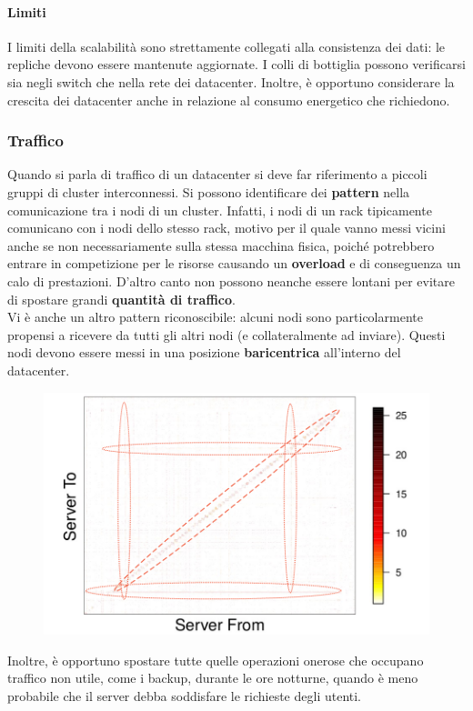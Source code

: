 \documentclass{article}
\begin{document}
		\hypertarget{limiti}{%
		\paragraph{Limiti}\label{limiti}}
		I limiti della scalabilità sono strettamente collegati alla
		consistenza dei dati: le repliche devono essere mantenute aggiornate. I colli di bottiglia possono verificarsi sia negli switch che nella rete dei datacenter. Inoltre, è opportuno considerare la crescita dei datacenter anche in relazione al
		consumo energetico che richiedono.
		
		\hypertarget{traffico}{%
		\subsubsection{Traffico}\label{traffico}}
		
		Quando si parla di traffico di un datacenter si deve far riferimento a piccoli gruppi di cluster interconnessi. Si possono identificare dei \textbf{pattern} nella comunicazione tra i nodi di un cluster. Infatti, i nodi di un rack tipicamente comunicano con i nodi dello stesso rack, motivo per il quale vanno messi vicini anche se non necessariamente sulla stessa macchina fisica, poiché potrebbero entrare in competizione per le risorse causando un \textbf{overload} e di conseguenza un calo di prestazioni. D'altro canto non possono neanche essere lontani per evitare di spostare grandi
		\textbf{quantità di traffico}.\\
		Vi è anche un altro pattern riconoscibile: alcuni nodi sono particolarmente propensi a ricevere da tutti gli altri nodi (e collateralmente ad inviare). Questi nodi devono essere messi in una posizione \textbf{baricentrica} all'interno del datacenter.
		
		\begin{figure}[th]
			\centering
			\includegraphics[width=0.5\linewidth]{images/SAC_B7_traffic}
		\end{figure}
		
		Inoltre, è opportuno spostare tutte quelle
		operazioni onerose che occupano traffico non utile, come i backup, durante le ore notturne, quando è meno probabile che il server debba soddisfare le richieste degli utenti.
		
\end{document}
